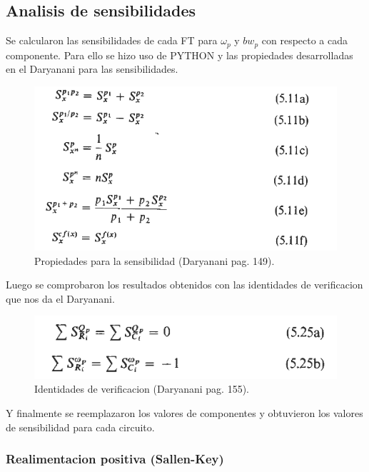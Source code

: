 \subsection{Analisis de sensibilidades}

Se calcularon las sensibilidades de cada FT para $\omega_p$ y $bw_p$ con respecto a cada componente. Para ello se hizo uso de PYTHON y las propiedades desarrolladas en el Daryanani para las sensibilidades.

\begin{figure}[H]
    \centering
    \includegraphics[scale=.5]{Secciones/Circ1/img/daryanani149.png}
    \caption{Propiedades para la sensibilidad (Daryanani pag. 149).}
    \label{prop}
\end{figure}

Luego se comprobaron los resultados obtenidos con las identidades de verificacion que nos da el Daryanani.

\begin{figure}[H]
    \centering
    \includegraphics[scale=.5]{Secciones/Circ1/img/daryanani155.png}
    \caption{Identidades de verificacion (Daryanani pag. 155).}
    \label{prop}
\end{figure}

Y finalmente se reemplazaron los valores de componentes y obtuvieron los valores de sensibilidad para cada circuito.

\subsubsection{Realimentacion positiva (Sallen-Key)}

